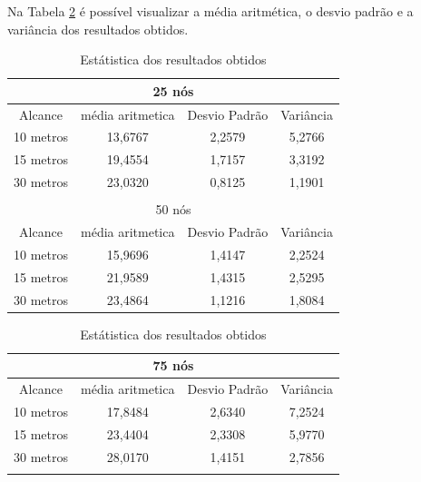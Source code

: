 	Na Tabela \ref{tab:estatiscaResultadosObtidos} é possível visualizar a média aritmética, o desvio padrão e a variância dos resultados obtidos. 

	\begin{table}[!htb]
	    \caption{Estátistica dos resultados obtidos}
	    \label{tab:estatiscaResultadosObtidos}
	    \centering
	    \tiny
	    \begin{minipage}{.5\linewidth}
	      
	      \centering
	        \begin{tabular}{|c|c|c|c|}

			\hline
			\multicolumn{4}{|c|}{25 nós} \\ \hline
			Alcance   & média aritmetica &	Desvio Padrão &	Variância  \\ \hline
			10 metros &	13,6767 & 2,2579 &	5,2766  \\ \hline
			15 metros &	19,4554 & 1,7157 &	3,3192  \\ \hline
			30 metros &	23,0320 & 0,8125 &	1,1901 \\ \hline

			\multicolumn{4}{|c|}{} \\ \hline

			\multicolumn{4}{|c|}{50 nós} \\ \hline
			Alcance   & média aritmetica &	Desvio Padrão &	Variância  \\ \hline
			10 metros &	15,9696	& 1,4147 & 2,2524  \\ \hline
			15 metros &	21,9589	& 1,4315 & 2,5295  \\ \hline
			30 metros &	23,4864	& 1,1216 & 1,8084 \\ \hline

		\end{tabular}
	    \end{minipage}%
	    \begin{minipage}{.5\linewidth}
	      \centering
	        \begin{tabular}{|c|c|c|c|}
	        \hline
			\multicolumn{4}{|c|}{75 nós} \\ \hline
			Alcance   & média aritmetica &	Desvio Padrão &	Variância  \\ \hline
			10 metros &	17,8484 & 2,6340 & 7,2524  \\ \hline
			15 metros &	23,4404 & 2,3308 & 5,9770  \\ \hline
			30 metros &	28,0170 & 1,4151 & 2,7856 \\ \hline

			\multicolumn{4}{|c|}{} \\ \hline



\end{tabular}
\end{minipage}
\end{table}
